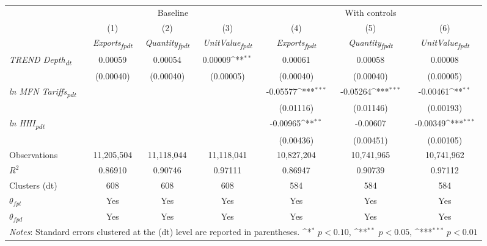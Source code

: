 {
\def\sym#1{\ifmmode^{#1}\else\(^{#1}\)\fi}
\begin{tabular}{l*{6}{c}}
\toprule
&\multicolumn{3}{c}{Baseline}&\multicolumn{3}{c}{With controls}\\\cmidrule(lr){2-4}\cmidrule(lr){5-7}
&(1)&(2)&(3)&(4)&(5)&(6)\\
&\textit{Exports\textsubscript{fpdt}}&\textit{Quantity\textsubscript{fpdt}}&\textit{UnitValue\textsubscript{fpdt}}&\textit{Exports\textsubscript{fpdt}}&\textit{Quantity\textsubscript{fpdt}}&\textit{UnitValue\textsubscript{fpdt}}\\
\midrule
\textit{TREND Depth\textsubscript{dt}} & 0.00059 & 0.00054 & 0.00009\sym{**} & 0.00061 & 0.00058 & 0.00008\\
 & (0.00040) & (0.00040) & (0.00005) & (0.00040) & (0.00040) & (0.00005)\\
\addlinespace
\textit{ln MFN Tariffs\textsubscript{pdt}} &  &  &  & -0.05577\sym{***} & -0.05264\sym{***} & -0.00461\sym{**}\\
 &  &  &  & (0.01116) & (0.01146) & (0.00193)\\
\addlinespace
\textit{ln HHI\textsubscript{pdt}} &  &  &  & -0.00965\sym{**} & -0.00607 & -0.00349\sym{***}\\
 &  &  &  & (0.00436) & (0.00451) & (0.00105)\\
\midrule
Observations & 11,205,504 & 11,118,044 & 11,118,041 & 10,827,204 & 10,741,965 & 10,741,962\\
$R^{2}$ & 0.86910 & 0.90746 & 0.97111 & 0.86947 & 0.90739 & 0.97112\\
Clusters (dt) & 608 & 608 & 608 & 584 & 584 & 584\\
$\theta_{fpt}$ & Yes & Yes & Yes & Yes & Yes & Yes\\
$\theta_{fpd}$ & Yes & Yes & Yes & Yes & Yes & Yes\\
\bottomrule
\multicolumn{7}{l}{\footnotesize \textit{Notes}: Standard errors clustered at the (dt) level are reported in parentheses. \sym{*} \(p<0.10\), \sym{**} \(p<0.05\), \sym{***} \(p<0.01\)}\\
\end{tabular}
}
